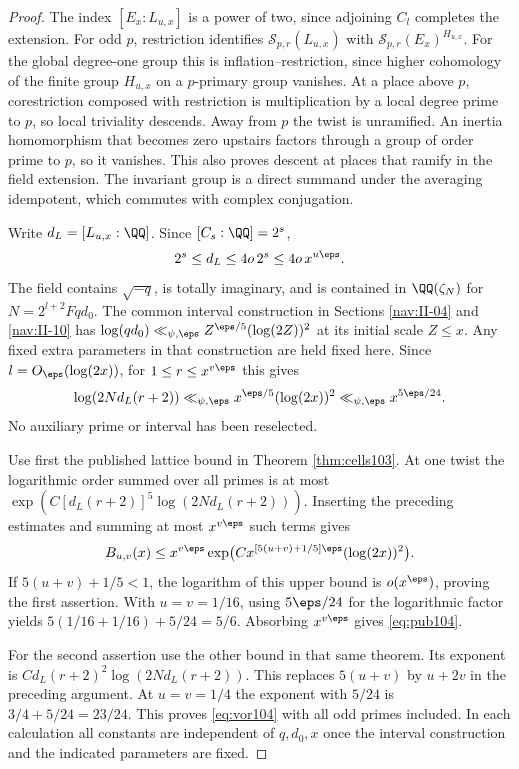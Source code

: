 \documentclass[a4paper,11pt]{article}
\theoremstyle{definition}
\theoremstyle{remark}
\numberwithin{equation}{section}
\begin{document}
\begin{proof}
The index \([E_x:L_{u,x}]\) is a power of two, since adjoining
\(C_l\) completes the extension. For odd \(p\), restriction
identifies \(\mathcal S_{p,r}(L_{u,x})\) with
\(\mathcal S_{p,r}(E_x)^{H_{u,x}}\). For the global degree-one
group this is inflation--restriction, since higher cohomology
of the finite group \(H_{u,x}\) on a \(p\)-primary group vanishes.
At a place above \(p\), corestriction composed with restriction
is multiplication by a local degree prime to \(p\), so local
triviality descends. Away from \(p\) the twist is unramified.
An inertia homomorphism that becomes zero upstairs factors
through a group of order prime to \(p\), so it vanishes.
This also proves descent at places that ramify in the field
extension. The invariant group is a direct summand under the
averaging idempotent, which commutes with complex conjugation.

Write \(d_L=[L_{u,x}:\QQ]\). Since \([C_s:\QQ]=2^s\),
\[
  2^s\le d_L\le 4o\,2^s\le 4o\,x^{u\eps}.
\]
The field contains \(\sqrt{-q}\), is totally imaginary, and is
contained in \(\QQ(\zeta_N)\) for \(N=2^{l+2}Fqd_0\). The common
interval construction in
Sections \ref{nav:II-04} and \ref{nav:II-10}
has \(\log(qd_0)\ll_{\psi,\eps}Z^{\eps/5}(\log(2Z))^2\) at its
initial scale \(Z\le x\). Any fixed extra parameters in that
construction are held fixed here. Since \(l=O_\eps(\log(2x))\),
for \(1\le r\le x^{v\eps}\) this gives
\[
 \log(2Nd_L(r+2))\ll_{\psi,\eps}
           x^{\eps/5}(\log(2x))^2
      \ll_{\psi,\eps} x^{5\eps/24}.
\]
No auxiliary prime or interval has been reselected.

Use first the published lattice bound in Theorem \ref{thm:cells103}.
At one twist the logarithmic order summed over all primes is at
most \(\exp(C[d_L(r+2)]^5\log(2Nd_L(r+2)))\). Inserting the
preceding estimates and summing at most \(x^{v\eps}\) such terms gives
\[
 B_{u,v}(x)\le x^{v\eps}
      \exp\!\big(C x^{[5(u+v)+1/5]\eps}(\log(2x))^2\big).
\]
If \(5(u+v)+1/5<1\), the logarithm of this upper bound is
\(o(x^\eps)\), proving the first assertion. With \(u=v=1/16\),
using \(5\eps/24\) for the logarithmic factor yields
\(5(1/16+1/16)+5/24=5/6\). Absorbing \(x^{v\eps}\) gives
\eqref{eq:pub104}.

For the second assertion use the other bound in that same
theorem. Its exponent is \(C d_L(r+2)^2\log(2Nd_L(r+2))\).
This replaces \(5(u+v)\) by \(u+2v\) in the preceding argument.
At \(u=v=1/4\) the exponent with \(5/24\) is \(3/4+5/24=23/24\).
This proves \eqref{eq:vor104} with all odd primes included. In
each calculation all constants are independent of \(q,d_0,x\)
once the interval construction and the indicated parameters are fixed.
\end{proof}
\end{document}
